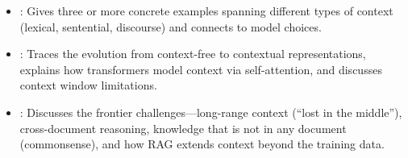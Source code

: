 \begin{interviewq}

\goodgreat
\begin{itemize}
    \item {}: Gives three or more concrete examples spanning different types
    of context (lexical, sentential, discourse) and connects to model choices.
    \item {}: Traces the evolution from context-free to contextual
    representations, explains how transformers model context via self-attention, and
    discusses context window limitations.
    \item {}: Discusses the frontier challenges---long-range context (``lost
    in the middle''), cross-document reasoning, knowledge that is not in any document
    (commonsense), and how RAG extends context beyond the training data.
\end{itemize}

\end{interviewq}

\vspace{0.5em}


